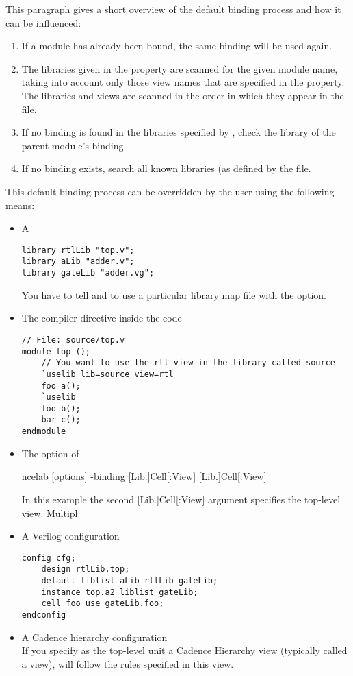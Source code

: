 This paragraph gives a short overview of the default binding process and how it
can be influenced:
\begin{enumerate}
    \item If a module has already been bound, the same binding will be used
 again.
    \item The libraries given in the  property are scanned for the
 given module name, taking into account only those view names that are
 specified in the  property. The libraries and views are scanned
 in the order in which they appear in the  file.
    \item If no binding is found in the libraries specified by ,
 check the library of the parent module's binding.
    \item If no binding exists, search all known libraries (as defined by the
  file.
\end{enumerate}

This default binding process can be overridden by the user using the following
means:
\begin{itemize}
    \item A 
 \begin{verbatim}
library rtlLib "top.v";
library aLib "adder.v";
library gateLib "adder.vg";
\end{verbatim}
 You have to tell  and  to use a particular library map
 file with the  option.
    \item The  compiler directive inside the  code
 \begin{verbatim}
// File: source/top.v
module top ();
    // You want to use the rtl view in the library called source
    `uselib lib=source view=rtl
    foo a();
    `uselib
    foo b();
    bar c();
endmodule
\end{verbatim}
    \item The  option of 
 \begin{lstbashplain}
 ncelab [options] -binding [Lib.]Cell[:View] [Lib.]Cell[:View]
\end{lstbashplain}
 In this example the second [Lib.]Cell[:View] argument specifies the top-level
 view. Multipl
    \item A Verilog configuration
 \begin{verbatim}
config cfg;
    design rtlLib.top;
    default liblist aLib rtlLib gateLib;
    instance top.a2 liblist gateLib;
    cell foo use gateLib.foo;
endconfig
\end{verbatim}
    \item A Cadence hierarchy configuration\\
 If you specify as the top-level unit a Cadence Hierarchy view (typically
 called a  view),  will follow the rules specified in
 this view.
\end{itemize}

